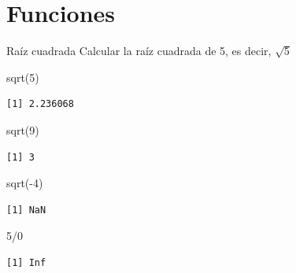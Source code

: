\documentclass[
  ignorenonframetext,
  aspectratio=169,
  spanish,
]{beamer}
\newenvironment{Shaded}{\begin{snugshade}}{\end{snugshade}}
\newcommand{\DecValTok}[1]{\textcolor[rgb]{0.68,0.00,0.00}{#1}}
\newcommand{\FunctionTok}[1]{\textcolor[rgb]{0.28,0.35,0.67}{#1}}
\newcommand{\NormalTok}[1]{\textcolor[rgb]{0.00,0.23,0.31}{#1}}
\newcommand{\SpecialCharTok}[1]{\textcolor[rgb]{0.37,0.37,0.37}{#1}}
\begin{document}
\section{Funciones}\label{funciones}

\begin{frame}[fragile]{Raíz cuadrada}
\label{rauxedz-cuadrada}
Calcular la raíz cuadrada de 5, es decir, \(\sqrt{5}\)

\begin{Shaded}
\begin{Highlighting}[]
\FunctionTok{sqrt}\NormalTok{(}\DecValTok{5}\NormalTok{)}
\end{Highlighting}
\end{Shaded}

\begin{verbatim}
[1] 2.236068
\end{verbatim}

\begin{Shaded}
\begin{Highlighting}[]
\FunctionTok{sqrt}\NormalTok{(}\DecValTok{9}\NormalTok{)}
\end{Highlighting}
\end{Shaded}

\begin{verbatim}
[1] 3
\end{verbatim}

\begin{Shaded}
\begin{Highlighting}[]
\FunctionTok{sqrt}\NormalTok{(}\SpecialCharTok{{-}}\DecValTok{4}\NormalTok{)}
\end{Highlighting}
\end{Shaded}

\begin{verbatim}
[1] NaN
\end{verbatim}

\begin{Shaded}
\begin{Highlighting}[]
\DecValTok{5}\SpecialCharTok{/}\DecValTok{0}
\end{Highlighting}
\end{Shaded}

\begin{verbatim}
[1] Inf
\end{verbatim}
\end{frame}
\end{document}

